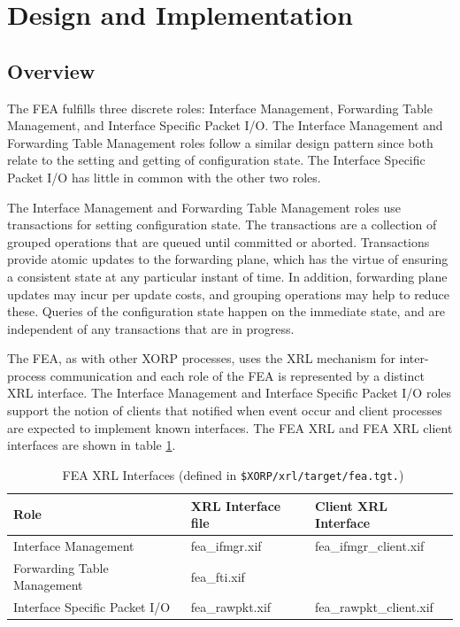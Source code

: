 \documentclass[11pt]{article}
\begin{document}
\section{Design and Implementation}

\subsection{Overview}

The FEA fulfills three discrete roles: Interface Management, Forwarding
Table Management, and Interface Specific Packet I/O.  The Interface
Management and Forwarding Table Management roles follow a similar
design pattern since both relate to the setting and getting of
configuration state.  The Interface Specific Packet I/O has little in
common with the other two roles.  

The Interface Management and Forwarding Table Management roles use
transactions for setting configuration state.  The transactions are a
collection of grouped operations that are queued until committed or
aborted.  Transactions provide atomic updates to the forwarding plane,
which has the virtue of ensuring a consistent state at any particular
instant of time.  In addition, forwarding plane updates may incur per
update costs, and grouping operations may help to reduce
these. Queries of the configuration state happen on the immediate
state, and are independent of any transactions that are in progress.

The FEA, as with other XORP processes, uses the XRL mechanism for
inter-process communication and each role of the FEA is represented by
a distinct XRL interface.  The Interface Management and Interface
Specific Packet I/O roles support the notion of clients that notified
when event occur and client processes are expected to implement known
interfaces.  The FEA XRL and FEA XRL client interfaces are shown in
table \ref{tbl:xifs}.

\begin{table}[h]
\begin{center}
\begin{tabular}{|l|l|l|}\hline
Role & XRL Interface file & Client XRL Interface\\ \hline\hline
Interface Management 		& fea\_ifmgr.xif	& fea\_ifmgr\_client.xif\\
Forwarding Table Management	& fea\_fti.xif 		& \\
Interface Specific Packet I/O	& fea\_rawpkt.xif 	& fea\_rawpkt\_client.xif\\ \hline
\end{tabular}
\caption{\label{tbl:xifs} \
	 FEA XRL Interfaces (defined in {\tt \$XORP/xrl/target/fea.tgt.}) }
\end{center}
\end{table}
\end{document}
